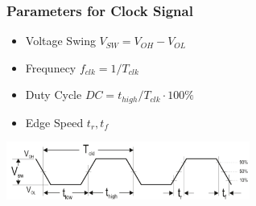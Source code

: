 \subsubsection{Parameters for Clock Signal}
\begin{minipage}{9cm}
	\begin{itemize}
		\item Voltage Swing $V_{SW}=V_{OH}-V_{OL}$
		\item Frequnecy $f_{clk}=1/T_{clk}$
		\item Duty Cycle $DC=t_{high}/T_{clk} \cdot 100 \%$
		\item Edge Speed $t_r, t_f$
	\end{itemize}
\end{minipage}
\begin{minipage}{8cm}
	\includegraphics[width=8cm]{images/clock_parameters.png}
\end{minipage}
\clearpage
\pagebreak